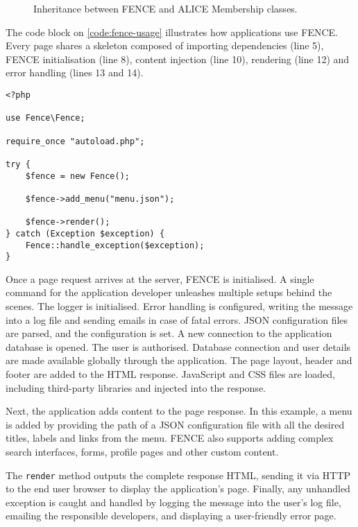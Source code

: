 \begin{figure}[htbp]
  \centering
  
  \caption{Inheritance between FENCE and ALICE Membership classes.}
  \label{fig:fence-inheritance}
\end{figure}

The code block on \autoref{code:fence-usage} illustrates how applications use FENCE. Every page shares a skeleton composed of importing dependencies (line 5), FENCE initialisation (line 8), content injection (line 10), rendering (line 12) and error handling (lines 13 and 14).

\begin{listing}
\begin{verbatim}
<?php

use Fence\Fence;

require_once "autoload.php";

try {
    $fence = new Fence();
    
    $fence->add_menu("menu.json");
    
    $fence->render();
} catch (Exception $exception) {
    Fence::handle_exception($exception);
}
\end{verbatim}
\caption{FENCE usage example.}
\label{code:fence-usage}
\end{listing}

Once a page request arrives at the server, FENCE is initialised. A single command for the application developer unleashes multiple setups behind the scenes. The logger is initialised. Error handling is configured, writing the message into a log file and sending emails in case of fatal errors. JSON configuration files are parsed, and the configuration is set. A new connection to the application database is opened. The user is authorised. Database connection and user details are made available globally through the application. The page layout, header and footer are added to the HTML response. JavaScript and CSS files are loaded, including third-party libraries and injected into the response.

Next, the application adds content to the page response. In this example, a menu is added by providing the path of a JSON configuration file with all the desired titles, labels and links from the menu. FENCE also supports adding complex search interfaces, forms, profile pages and other custom content.

The \texttt{render} method outputs the complete response HTML, sending it via HTTP to the end user browser to display the application's page. Finally, any unhandled exception is caught and handled by logging the message into the user's log file, emailing the responsible developers, and displaying a user-friendly error page.


